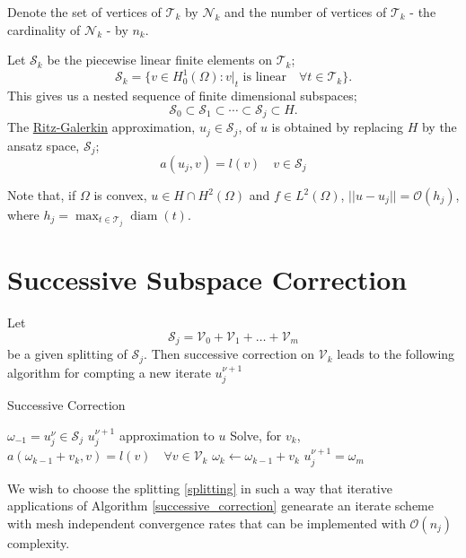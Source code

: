 \documentclass[a4paper,10pt,oneside]{book}
\theoremstyle{plain}%
\theoremstyle{definition}
\theoremstyle{remark}
\DeclareMathOperator{\diam}{diam}
\newcommand{\calO}{\mathcal{O}}
\newcommand{\calS}{\mathcal{S}}
\newcommand{\calT}{\mathcal{T}}
\newcommand{\calV}{\mathcal{V}}
\newcommand{\calN}{\mathcal{N}}
\begin{document}
Denote the set of vertices of $\calT_k$ by $\calN_k$ and the number of vertices
of $\calT_k$ - the cardinality of $\calN_k$ - by $n_k$.

Let $\calS_k$ be the piecewise linear finite elements on $\calT_k$;
  \begin{equation}
   \calS_k=\{v\in H_0^1(\Omega):v|_t\text{ is linear}\quad\forall t\in\calT_k\}.
  \end{equation}
This gives us a nested sequence of finite dimensional subspaces;
  \begin{equation}
   \calS_0\subset\calS_1\subset\cdots\subset\calS_j\subset H. \label{hierarchy}
  \end{equation}
The \underline{Ritz-Galerkin} approximation, $u_j\in\calS_j$, of $u$ is
obtained by replacing $H$ by the ansatz space, $\calS_j$;
  \begin{equation}
   a(u_j,v)=l(v)\quad v\in\calS_j
  \end{equation}

Note that, if $\Omega$ is convex, $u\in H\cap H^2(\Omega)$ and $f\in
L^2(\Omega)$, $||u-u_j||=\calO(h_j)$, where $h_j = \max_{t\in\calT_j}\diam(t)$.

\section{Successive Subspace Correction}
Let
  \begin{equation}
    \calS_j = \calV_0 + \calV_1 + \dots + \calV_m \label{splitting}
  \end{equation}
be a given splitting of $\calS_j$. Then successive correction on $\calV_k$
leads to the following algorithm for compting a new iterate $u_j^{\nu+1}$
\begin{algorithm}
 \label{successive_correction}
 \caption{Successive Correction}
 \begin{algorithmic}
  \REQUIRE $\omega_{-1}=u^\nu_j\in\calS_j$
  \ENSURE $u_j^{\nu+1}$ approximation to $u$
    \STATE Solve, for $v_k$, $a(\omega_{k-1}+v_k, v) = l(v)\quad\forall
v\in\calV_k$
    \STATE $\omega_k\gets\omega_{k-1}+v_k$
  \ENDFOR
  \STATE $u_j^{\nu+1}=\omega_m$
 \end{algorithmic}
\end{algorithm}

We wish to choose the splitting \eqref{splitting} in such a way that
iterative applications of Algorithm \ref{successive_correction} genearate an
iterate scheme with mesh independent convergence rates that can be implemented
with $\calO(n_j)$ complexity.
\end{document}
